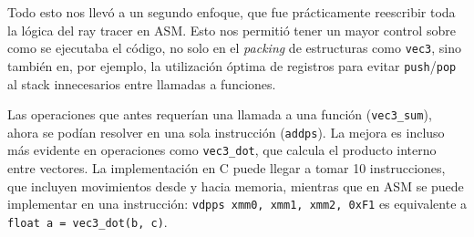 Todo esto nos llevó a un segundo enfoque, que fue prácticamente reescribir toda
la lógica del ray tracer en ASM. Esto nos permitió tener un mayor control sobre
como se ejecutaba el código, no solo en el \textit{packing} de estructuras como
\texttt{vec3}, sino también en, por ejemplo, la utilización óptima de registros
para evitar \texttt{push}/\texttt{pop} al stack innecesarios entre llamadas a
funciones.

Las operaciones que antes requerían una llamada a una función
(\texttt{vec3\_sum}), ahora se podían resolver en una sola instrucción
(\texttt{addps}). La mejora es incluso más evidente en operaciones como
\texttt{vec3\_dot}, que calcula el producto interno entre vectores. La
implementación en C puede llegar a tomar 10 instrucciones, que incluyen
movimientos desde y hacia memoria, mientras que en ASM se puede implementar en
una instrucción: \texttt{vdpps xmm0, xmm1, xmm2, 0xF1} es equivalente a
\texttt{float a = vec3\_dot(b, c)}.
